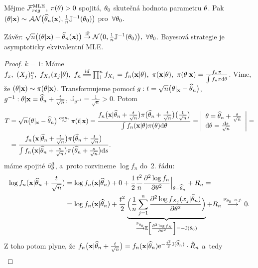 \begin{dusl}
	Mějme $\mathcal{F}_{reg}^{\mathrm{{\footnotesize MLE }}}$, $\pi(\theta)>0$ spojitá, $\theta_0$ skutečná hodnota parametru $\theta$. Pak $(\theta|\textbf{x})\sim\mathcal{AN}\big(\widehat{\theta}_n(\textbf{x}),\frac{1}{n}\mathbb{J}^{-1}(\theta_0)\big)$ pro~$\forall\theta_0$.
	
	Závěr: $\sqrt{n}\big( (\theta|\textbf{x})-\widehat{\theta}_n(\textbf{x}) \big)\stackrel{\mathscr{D}}{\to} \mathcal{N}\big( 0,\frac{1}{n}\mathbb{J}^{-1}(\theta_0) \big),~\forall\theta_0$. Bayesová strategie je asymptoticky ekvivalentní MLE.
	\begin{proof}
		$k=1$: Máme $f_x,~(X_j)_1^n,~f_{X_j}(x_j|\t),~f_n\equal{id}\prod_1^n f_{X_j}=f_n(\textbf{x}|\t),~\pi(\textbf{x}|\t),~\pi(\t|\textbf{x})=\frac{f_n \pi}{\int f_n \pi\d\t}$. Víme, že $(\theta|\textbf{x})\sim\pi(\theta|\textbf{x})$. Transformujeme pomocí $g: t=\sqrt{n}\big( \theta|_\textbf{x}-\widehat{\theta}_n \big)$, $g^{-1}:\theta|\textbf{x}=\widehat{\theta}_n + \frac{t}{\sqrt{n}}$, $\mathbb{J}_{g^{-1}}=\frac{1}{\sqrt{n}}>0$. Potom
		\[
		\begin{split}
		T&=\sqrt{n}\big(\theta|_\textbf{x}-\widehat{\theta}_n\big)\stackrel{ozn.}{\sim}\pi(t|\textbf{x})=\frac{f_n\big(\textbf{x}|\widehat{\theta}_n+\frac{t}{\sqrt{n}}\big)\pi\big( \widehat{\theta}_n+\frac{t}{\sqrt{n}} \big)\big(\frac{1}{\sqrt{n}}\big)}{\int f_n(\textbf{x}|\theta)\pi(\theta)\mathrm{d}\theta}=\left|\begin{array}{l}
		\theta=\widehat{\theta}_n+\frac{s}{\sqrt{n}}\\\mathrm{d}\theta=\frac{\mathrm{d} s}{\sqrt{n}}\end{array}
		\right|=\\ &=\frac{f_n\big(\textbf{x}|\widehat{\theta}_n+\frac{t}{\sqrt{n}}\big)\pi\big( \widehat{\theta}_n+\frac{t}{\sqrt{n}} \big)}{\int f_n\big(\textbf{x}|\widehat{\theta}_n+\frac{s}{\sqrt{n}}\big)\pi\big( \widehat{\theta}_n+\frac{s}{\sqrt{n}} \big)\mathrm{d} s}.
		\end{split}
		\]
		máme spojité $\partial_\theta^3$, a~proto rozvineme $\log f_n$ do~2. řádu:
		\[
		\begin{split}
		\log f_n(\textbf{x}|\widehat{\theta}_n+\frac{t}{\sqrt{n}})&=\log f_n(\textbf{x}|\widehat{\theta}_n)+0+\frac{1}{2}\frac{t^2}{n}\frac{\partial^2 \log f_n}{\partial\theta^2}\Big|_{\theta=\widehat{\theta}_n}+R_n=\\&=\log f_n(\textbf{x}|\widehat{\theta}_n)+\frac{t^2}{2}\underbrace{\Big( \frac{1}{n}\sum\limits_{j=1}^{n} \frac{\partial^2 \log f_{X_j}(x_j|\widehat{\theta}_n)}{\partial\theta^2} \Big)}_{\stackrel{\mathbb{P}_{\theta_0}}{\longrightarrow}\mathbb{E}\left[ \frac{\partial^2\log f_X}{\partial\theta^2} \right]=-\mathbb{J}(\theta_0)}+R_n\stackrel{\mathbb{P}_{\theta_0}~s.j.}{\longrightarrow}0.
		\end{split}
		\]
		Z toho potom plyne, že $f_n\big(\textbf{x}|\widehat{\theta}_n+\frac{t}{\sqrt{n}}\big)=f_n(\textbf{x}|\widehat{\theta}_n)\mathrm{e}^{-\frac{t^2}{2}\mathbb{J}(\widehat{\theta}_n)}\cdot\tilde{R}_n$ a~tedy \[
		\begin{split}

\end{split}\]
\end{proof}
\end{dusl}
